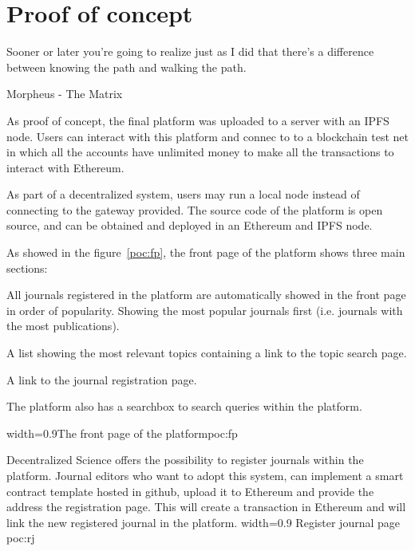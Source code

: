 \chapter{Proof of concept}
\label{poc}
\begin{FraseCelebre}
  \begin{Frase}
    Sooner or later you're going to realize just as I did that there's a
    difference between knowing the path and walking the path.
  \end{Frase}
  \begin{Fuente}
    Morpheus - The Matrix
  \end{Fuente}
\end{FraseCelebre}

As proof of concept, the final platform was uploaded to a server with an IPFS
node. Users can interact with this platform and connec to to a blockchain test
net in which all the accounts have unlimited money to make all the transactions
to interact with Ethereum.

As part of a decentralized system, users may run a local node instead of
connecting to the gateway provided. The source code of the platform is open
source, and can be obtained and deployed in an Ethereum and IPFS node.


As showed in the figure~\ref{poc:fp}, the front page of the platform shows three
main sections:

\begin{itemize}
   All journals registered in
  the platform are automatically showed in the front page in order of
  popularity. Showing the most popular journals first (i.e. journals with the
  most publications).

   A list showing the most relevant topics containing a
  link to the topic search page.

   A link to the journal registration page.

\end{itemize}

The platform also has a searchbox to search queries within the platform.

 {width=0.9\linewidth}{The front page of the
  platform}{poc:fp}


Decentralized Science offers the possibility to register journals within the
platform. Journal editors who want to adopt this system, can implement a smart
contract template hosted in github, upload it to Ethereum and provide the
address the registration page. This will create a transaction in Ethereum and
will link the new registered journal in the platform. %
{width=0.9\linewidth}%
{Register journal page}%
{poc:rj}

